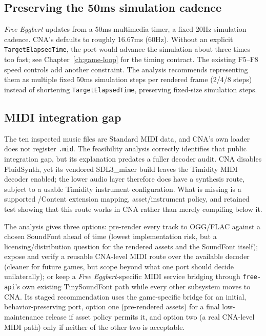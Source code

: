 \subsection{Preserving the 50ms simulation cadence}

\emph{Free Eggbert} updates from a 50ms multimedia timer, a fixed 20Hz simulation cadence. CNA's
 defaults to roughly 16.67ms (60Hz). Without an explicit
\texttt{TargetElapsedTime}, the port would advance the simulation about three times too fast; see
Chapter~\ref{ch:game-loop} for the timing contract. The existing F5--F8 speed controls add another
constraint. The analysis recommends
representing them as multiple fixed 50ms simulation steps per rendered frame (2/4/8 steps)
instead of shortening \texttt{TargetElapsedTime}, preserving fixed-size simulation steps.

\subsection{MIDI integration gap}

The ten inspected music files are Standard MIDI data, and CNA's own  loader does
not register \texttt{.mid}. The feasibility analysis correctly identifies that public integration
gap, but its explanation predates a fuller decoder audit. CNA disables FluidSynth, yet its vendored
SDL3\_mixer build leaves the Timidity MIDI decoder enabled; the lower audio layer therefore does
have a synthesis route, subject to a usable Timidity instrument configuration. What is missing is
a supported /Content extension mapping, asset/instrument policy, and retained test
showing that this route works in CNA rather than merely compiling below it.

The analysis gives three options: pre-render every
track to OGG/FLAC against a chosen SoundFont ahead of time (lowest implementation risk, but a
licensing/distribution question for the rendered assets and the SoundFont itself); expose and
verify a reusable CNA-level MIDI route over the available decoder (cleaner for future games, but
scope beyond what one port should decide unilaterally); or keep a
\emph{Free Eggbert}-specific MIDI service bridging through \texttt{free-api}'s own existing
TinySoundFont path while every other subsystem moves to CNA. Its staged recommendation uses the
game-specific bridge for an
initial, behavior-preserving port, option one (pre-rendered assets) for a final low-maintenance
release if asset policy permits it, and option two (a real CNA-level MIDI path) only if neither
of the other two is acceptable.

